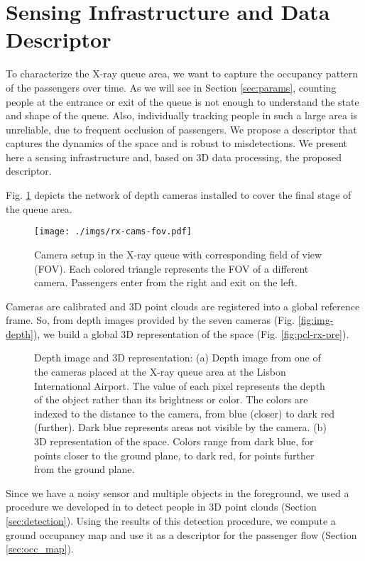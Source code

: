 \section{Sensing Infrastructure and Data Descriptor}
\label{sec:sensing}
%
To characterize the X-ray queue area, we want to capture the occupancy pattern of the passengers over time. 
As we will see in Section \ref{sec:params}, counting people at the entrance or exit of the queue is not enough to understand the state and shape of the queue. Also, individually tracking people in such a large area is unreliable, due to frequent occlusion of passengers. We propose a descriptor 
that captures the dynamics of the space and is robust to misdetections.
We present here a sensing infrastructure and, based on 3D data processing, the proposed descriptor.

Fig. \ref{fig:rx-cams-fov} depicts the network of depth cameras installed to cover the final stage of the queue area.
\begin{figure}[tbh]
\centering
\texttt{[image: ./imgs/rx-cams-fov.pdf]}
\caption{Camera setup in the X-ray queue with corresponding field of view (FOV). Each colored triangle represents the FOV of a different camera. Passengers enter from the right and exit on the left.}
\label{fig:rx-cams-fov}
\end{figure}
%
Cameras are calibrated and 3D point clouds are registered into a global reference frame. 
So, from depth images provided by the seven cameras (Fig. \ref{fig:img-depth}), we build a global 3D representation of the space (Fig. \ref{fig:pcl-rx-pre}).
%
\begin{figure}[tbh]
\centering
{}
\caption{Depth image and 3D representation: (a) Depth image from one of the cameras placed at the X-ray queue area at the Lisbon International Airport. The value of each pixel represents the depth of the object rather than its brightness or color. The colors are indexed to the distance to the camera, from blue (closer) to dark red (further). Dark blue represents areas not visible by the camera. (b) 3D representation of the space. Colors range from dark blue, for points closer to the ground plane, to dark red, for points further from the ground plane.}
\label{fig:3d-data}
\end{figure}%
%
Since we have a noisy sensor and multiple objects in the foreground, we used a procedure we developed in \cite{carvalho2016detecting} to detect people in 3D point clouds (Section \ref{sec:detection}).
%
Using the results of this detection procedure, we compute a ground occupancy map and use it as a descriptor for the passenger flow (Section \ref{sec:occ_map}).
%
